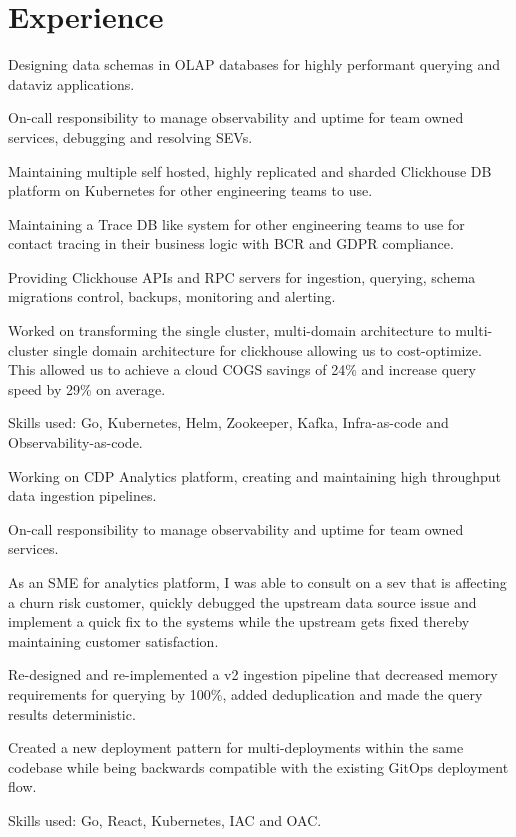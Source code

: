 \section{Experience}

    \begin{tightemize}
      \item Designing data schemas in OLAP databases for highly performant querying and dataviz applications.
      \item On-call responsibility to manage observability and uptime for team owned services, debugging and resolving SEVs.
      \item Maintaining multiple self hosted, highly replicated and sharded Clickhouse DB platform on Kubernetes for other engineering teams to use.
      \item Maintaining a Trace DB like system for other engineering teams to use for contact tracing in their business logic with BCR and GDPR compliance.
      \item Providing Clickhouse APIs and RPC servers for ingestion, querying, schema migrations control, backups, monitoring and alerting.
      \item Worked on transforming the single cluster, multi-domain architecture to multi-cluster single domain architecture for clickhouse allowing us to cost-optimize. This allowed us to achieve a cloud COGS savings of 24\% and increase query speed by 29\% on average.
      \item Skills used: Go, Kubernetes, Helm, Zookeeper, Kafka, Infra-as-code and Observability-as-code.
    \end{tightemize}
    \sectionsep

    \begin{tightemize}
      \item Working on CDP Analytics platform, creating and maintaining high throughput data ingestion pipelines.
      \item On-call responsibility to manage observability and uptime for team owned services.
      \item As an SME for analytics platform, I was able to consult on a sev that is affecting a churn risk customer, quickly debugged the upstream data source issue and implement a quick fix to the systems while the upstream gets fixed thereby maintaining customer satisfaction.
      \item Re-designed and re-implemented a v2 ingestion pipeline that decreased memory requirements for querying by 100\%, added deduplication and made the query results deterministic.
      \item Created a new deployment pattern for multi-deployments within the same codebase while being backwards compatible with the existing GitOps deployment flow.
      \item Skills used: Go, React, Kubernetes, IAC and OAC.
    \end{tightemize} 
    \sectionsep

